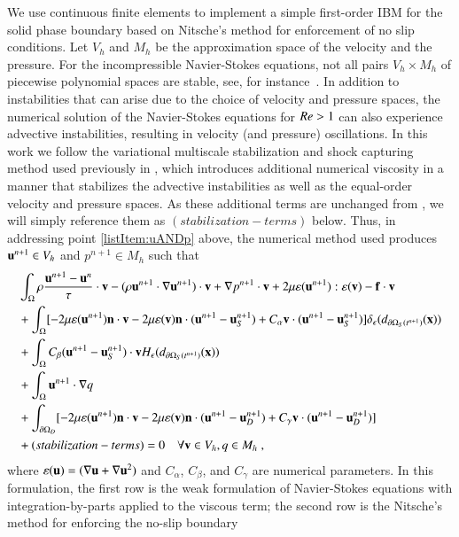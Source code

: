 \documentclass[final,3p,times]{elsarticle}
\newcommand\Rey{\mbox{\textit{Re}}}
\begin{document}
We use continuous finite elements to implement a simple first-order IBM for the solid phase boundary based on Nitsche's method for enforcement of no slip conditions. 
Let $V_h$ and $M_h$ be the approximation space of the velocity and the pressure. For the incompressible Navier-Stokes equations, not all pairs $V_h\times M_h$ of piecewise polynomial spaces are stable, see, for instance~\cite{Arnold1990, EG04}. In addition to instabilities that can arise due to the choice of velocity and pressure spaces, the numerical solution of the Navier-Stokes equations for ${\Rey}>1$ can also experience advective instabilities, resulting in velocity (and pressure) oscillations. In this work we follow the variational multiscale stabilization and shock capturing method used previously in \cite{KAFB11}, which introduces additional numerical viscosity in a manner that stabilizes the advective instabilities as well as the equal-order velocity and pressure spaces. As these additional terms are unchanged from \cite{KAFB11}, we will simply reference them as $(stabilization-terms)$ below. Thus, in addressing point \ref{listItem:uANDp} above, the numerical method used produces $\mathbf{u}^{n+1}\in V_h$ and $p^{n+1}\in M_h$ such that 
\begin{align}
   &\int_\Omega\rho \frac{\mathbf{u}^{n+1}-\mathbf{u}^n}{\tau}\cdot\mathbf{v} - (\rho \mathbf{u}^{n+1}\cdot \nabla \mathbf{u}^{n+1})\cdot \mathbf{v} 
   +\nabla p^{n+1}\cdot\mathbf{v} +2\mu\varepsilon(\mathbf{u}^{n+1}):\varepsilon(\mathbf{v})
   -\mathbf{f}\cdot\mathbf{v}\nonumber\\
   &+\int_\Omega [-2\mu \varepsilon(\mathbf{u}^{n+1})\mathbf{n}\cdot\mathbf{v}
   -2\mu\varepsilon(\mathbf{v})\mathbf{n}\cdot(\mathbf{u}^{n+1}-\mathbf{u}_S^{n+1})
   +C_\alpha\mathbf{v}\cdot(\mathbf{u}^{n+1}-\mathbf{u}_S^{n+1})]\delta_\epsilon(d_{\partial\Omega_S(t^{n+1})}(\mathbf{x}))\nonumber\\
   &+\int_\Omega C_\beta (\mathbf{u}^{n+1}-\mathbf{u}_S^{n+1})\cdot\mathbf{v} H_\epsilon(d_{\partial\Omega_S(t^{n+1})}(\mathbf{x}))\nonumber\\
   &+\int_\Omega \mathbf{u}^{n+1}\cdot\nabla q \nonumber\\
   &+\int_{\partial\Omega_D} [-2\mu\varepsilon(\mathbf{u}^{n+1})\mathbf{n}\cdot\mathbf{v}
   -2\mu\varepsilon(\mathbf{v})\mathbf{n}\cdot(\mathbf{u}^{n+1}-\mathbf{u}_D^{n+1})
   +C_\gamma\mathbf{v}\cdot(\mathbf{u}^{n+1}-\mathbf{u}_D^{n+1})]\nonumber\\
   &+(stabilization-terms)=0 \quad\forall \mathbf{v}\in V_h, q\in M_h \; ,
 \end{align}
 where $\varepsilon(\mathbf{u}) = (\nabla \mathbf{u} + \nabla \mathbf{u}^2)$ and $C_{\alpha}$, $C_{\beta}$, and $C_{\gamma}$ are numerical parameters. In this formulation, the first row is the weak formulation of Navier-Stokes equations with integration-by-parts applied to the  viscous term; the second row is the Nitsche's method for enforcing the no-slip boundary
\end{document}
